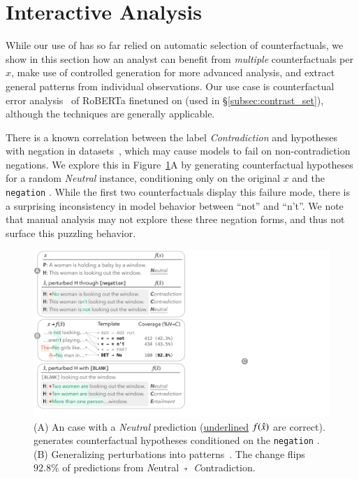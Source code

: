 

\section{Interactive Analysis}
\label{sec:app_err_analysis}

While our use of \sysname has so far relied on automatic selection of counterfactuals, we show in this section how an analyst can benefit from \emph{multiple} counterfactuals per $x$, make use of controlled generation for more advanced analysis, and extract general patterns from individual observations.
Our use case is counterfactual error analysis~\cite{wu2019errudite} of RoBERTa finetuned on \nli (used in \S\ref{subsec:contrast_set}), although the techniques are generally applicable.

There is a known correlation between the label \emph{Contradiction} and hypotheses with negation in \nli datasets~\cite{gururangan2018annotation}, which may cause models to fail on non-contradiction negations.
We explore this in Figure~\ref{fig:err_analysis}A by generating counterfactual hypotheses for a random \emph{Neutral} instance, conditioning only on the original $x$ and the \texttt{negation} \tagstr.
While the first two counterfactuals display this failure mode, there is a surprising inconsistency in model behavior between ``not'' and ``n't''.
We note that manual analysis may not explore these three negation forms, and thus not surface this puzzling behavior.

\begin{figure}[t]
\centering
\includegraphics[trim={0 12.5cm 33cm 0cm},clip,width=1\columnwidth]{figures/err_analysis.pdf}
\vspace{-15pt}
\caption{
(A) An \nli case with a \emph{Neutral} prediction (\uline{underlined} $f(\hat{x})$ are correct).
\sysname generates counterfactual hypotheses conditioned on the \texttt{negation} \tagstr. 
(B) Generalizing perturbations into patterns~\cite{wu2020tempura}. The change  flips $92.8\%$ of predictions from \emph{N}eutral~$\veryshortarrow$~\emph{C}ontradiction.
}
\vspace{-15pt}
\label{fig:err_analysis}
\end{figure}


